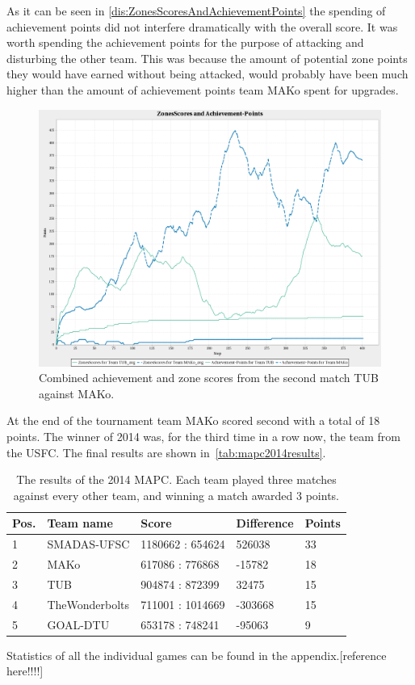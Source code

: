 As it can be seen in \autoref{dis:ZonesScoresAndAchievementPoints} the spending of achievement points did not interfere dramatically with the overall score.
It was worth spending the achievement points for the purpose of attacking and disturbing the other team.
This was because the amount of potential zone points they would have earned without being attacked, would probably have been much higher than the amount of achievement points team MAKo spent for upgrades.
\begin{figure}[h]
	\centering
	\includegraphics[width=\textwidth]{images/ZonesScoresAndAchievementPoints.png}
	\caption{Combined achievement and zone scores from the second match TUB against MAKo.} %
	\label{dis:ZonesScoresAndAchievementPoints}
\end{figure}
At the end of the tournament team MAKo scored second with a total of 18 points.
The winner of 2014 was, for the third time in a row now, the team from the USFC.
The final results are shown in~\autoref{tab:mapc2014results}.
\begin{table}[ht]
\centering
\caption{The results of the 2014 MAPC. Each team played three matches against every other team, and winning a match awarded 3 points.}
\label{tab:mapc2014results}
\begin{tabular}{@{}lllll@{}}
\toprule
Pos. & Team name      & Score            & Difference            & Points \\ \midrule
1    & SMADAS-UFSC    & 1180662 : 654624 & \phantom{-}526038     & 33     \\
2    & MAKo           & 617086 : 776868  & -15782                & 18     \\
3    & TUB            & 904874 : 872399  & \phantom{-}32475      & 15     \\
4    & TheWonderbolts & 711001 : 1014669 & -303668               & 15     \\
5    & GOAL-DTU       & 653178 : 748241  & -95063                & 9      \\ \bottomrule
\end{tabular}
\end{table}
Statistics of all the individual games can be found in the appendix.[reference here!!!!]

